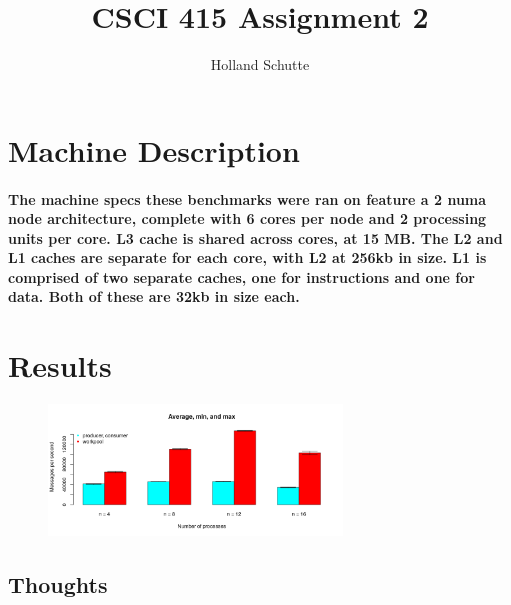 \documentclass[8pt, a4paper, twoside, twoclumn, english]{extreport}
\begin{document}
\title{CSCI 415 Assignment 2}
\author{Holland Schutte}
\maketitle

\section{Machine Description}

\paragraph{
  The machine specs these benchmarks were ran on feature a 2 numa node architecture,
  complete with 6 cores per node and 2 processing units per core. L3 cache is shared
  across cores, at 15 MB. The L2 and L1 caches are separate for each core, with L2
  at 256kb in size. L1 is comprised of two separate caches,
  one for instructions and one for data. Both of these are 32kb in size each.
}

\section {Results}

\begin{figure}[h]
\caption{}
\centering
\includegraphics[scale=0.5, height=3.5cm]{avgminmax}
\end{figure}

\subsection {Thoughts}
\end{document}
